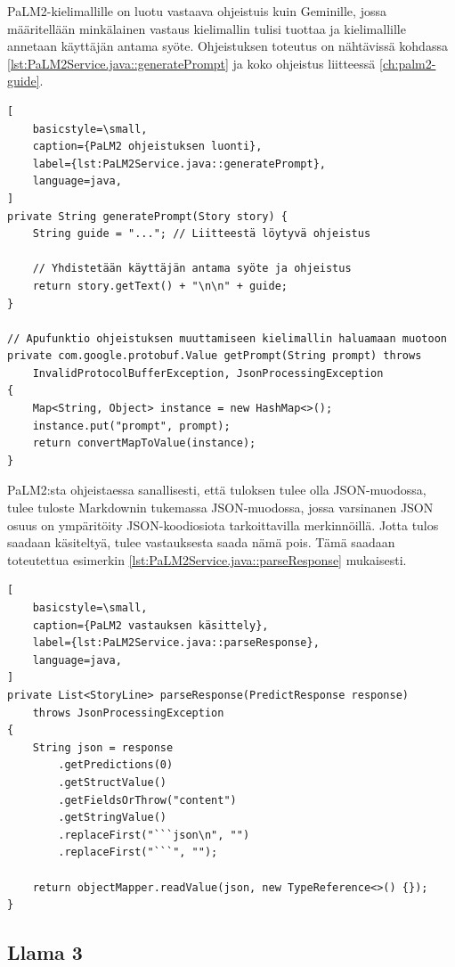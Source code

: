 PaLM2-kielimallille on luotu vastaava ohjeistuis kuin Geminille, jossa
määritellään minkälainen vastaus kielimallin tulisi tuottaa ja kielimallille
annetaan käyttäjän antama syöte. Ohjeistuksen toteutus on nähtävissä kohdassa
\ref{lst:PaLM2Service.java::generatePrompt} ja koko ohjeistus liitteessä \ref{ch:palm2-guide}.

\begin{lstlisting}[
    basicstyle=\small,
    caption={PaLM2 ohjeistuksen luonti},
    label={lst:PaLM2Service.java::generatePrompt},
    language=java,
]
private String generatePrompt(Story story) {
    String guide = "..."; // Liitteestä löytyvä ohjeistus

    // Yhdistetään käyttäjän antama syöte ja ohjeistus
    return story.getText() + "\n\n" + guide;
}

// Apufunktio ohjeistuksen muuttamiseen kielimallin haluamaan muotoon
private com.google.protobuf.Value getPrompt(String prompt) throws
    InvalidProtocolBufferException, JsonProcessingException
{
    Map<String, Object> instance = new HashMap<>();
    instance.put("prompt", prompt);
    return convertMapToValue(instance);
}
\end{lstlisting}

PaLM2:sta ohjeistaessa sanallisesti, että tuloksen tulee olla JSON-muodossa,
tulee tuloste Markdownin tukemassa JSON-muodossa, jossa varsinanen JSON osuus
on ympäritöity JSON-koodiosiota tarkoittavilla merkinnöillä. Jotta tulos
saadaan käsiteltyä, tulee vastauksesta saada nämä pois. Tämä saadaan
toteutettua esimerkin \ref{lst:PaLM2Service.java::parseResponse} mukaisesti.

\begin{lstlisting}[
    basicstyle=\small,
    caption={PaLM2 vastauksen käsittely},
    label={lst:PaLM2Service.java::parseResponse},
    language=java,
]
private List<StoryLine> parseResponse(PredictResponse response)
    throws JsonProcessingException
{
    String json = response
        .getPredictions(0)
        .getStructValue()
        .getFieldsOrThrow("content")
        .getStringValue()
        .replaceFirst("```json\n", "")
        .replaceFirst("```", "");

    return objectMapper.readValue(json, new TypeReference<>() {});
}
\end{lstlisting}

\subsection{Llama 3}

